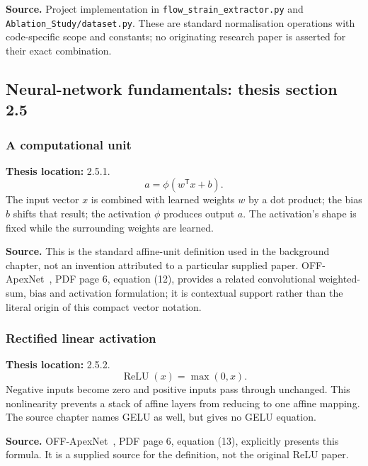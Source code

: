 \documentclass[11pt,a4paper]{article}
\numberwithin{equation}{section}
\begin{document}
\textbf{Source.} Project implementation in
\texttt{flow\_strain\_extractor.py} and \texttt{Ablation\_Study/dataset.py}.
These are standard normalisation operations with code-specific scope and
constants; no originating research paper is asserted for their exact combination.

\subsection{Neural-network fundamentals: thesis section 2.5}

\subsubsection{A computational unit}
\label{fg:unit}
\textbf{Thesis location:} 2.5.1.
\begin{equation}
    a=\phi(w^{\mathsf T}x+b).
    \label{fg:eq:unit}
\end{equation}
The input vector $x$ is combined with learned weights $w$ by a dot product;
the bias $b$ shifts that result; the activation $\phi$ produces output $a$.
The activation's shape is fixed while the surrounding weights are learned.

\textbf{Source.} This is the standard affine-unit definition used in the
background chapter, not an invention attributed to a particular supplied paper.
OFF-ApexNet~\cite{liong2019a}, PDF page 6, equation (12), provides a related
convolutional weighted-sum, bias and activation formulation; it is contextual
support rather than the literal origin of this compact vector notation.

\subsubsection{Rectified linear activation}
\label{fg:relu}
\textbf{Thesis location:} 2.5.2.
\begin{equation}
    \operatorname{ReLU}(x)=\max(0,x).
    \label{fg:eq:relu}
\end{equation}
Negative inputs become zero and positive inputs pass through unchanged. This
nonlinearity prevents a stack of affine layers from reducing to one affine
mapping. The source chapter names GELU as well, but gives no GELU equation.

\textbf{Source.} OFF-ApexNet~\cite{liong2019a}, PDF page 6, equation (13),
explicitly presents this formula. It is a supplied source for the definition,
not the original ReLU paper.
\end{document}
